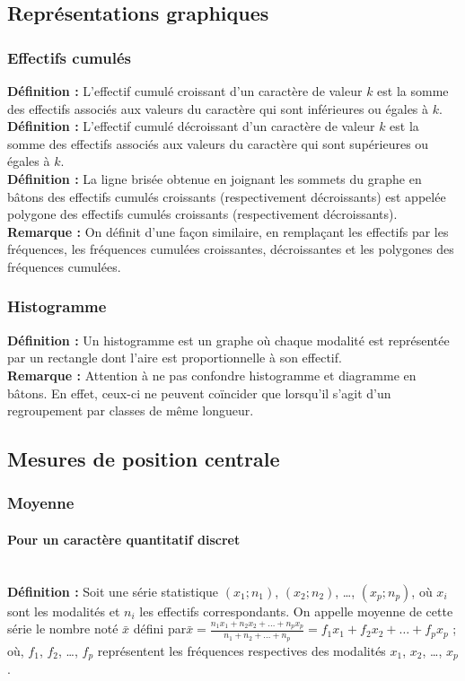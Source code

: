 \documentclass[a4paper,titlepage]{article}
\begin{document}
    \subsection{Représentations graphiques}
        \subsubsection{Effectifs cumulés}
            \textbf{Définition :} L’effectif cumulé croissant d’un caractère de valeur $k$ est la somme des effectifs associés aux valeurs du caractère qui sont inférieures ou égales à $k$.
            \\
            \textbf{Définition :} L’effectif cumulé décroissant d’un caractère de valeur $k$ est la somme des effectifs associés aux valeurs du caractère qui sont supérieures ou égales à $k$.
            \\
            \textbf{Définition :} La ligne brisée obtenue en joignant les sommets du graphe en bâtons des effectifs cumulés croissants (respectivement décroissants) est appelée polygone des effectifs cumulés croissants (respectivement décroissants).
            \\
            \textbf{Remarque :} On définit d’une façon similaire, en remplaçant les effectifs par les fréquences, les fréquences cumulées croissantes, décroissantes et les polygones des fréquences cumulées.
        \subsubsection{Histogramme}
            \textbf{Définition :} Un histogramme est un graphe où chaque modalité est représentée par un rectangle dont l’aire est proportionnelle à son effectif.
            \\
            \textbf{Remarque :} Attention à ne pas confondre histogramme et diagramme en bâtons. En effet, ceux-ci ne peuvent coïncider que lorsqu’il s’agit d’un regroupement par classes de même longueur.
    \subsection{Mesures de position centrale}
        \subsubsection{Moyenne}
            \paragraph{Pour un caractère quantitatif discret}\mbox{}\\
                \textbf{Définition :} Soit une série statistique $\left(x_{1};n_{1}\right)$, $\left(x_{2};n_{2}\right)$, \ldots, $\left(x_{p};n_{p}\right)$, où $x_{i}$ sont les modalités et $n_{i}$ les effectifs correspondants. On appelle moyenne de cette série le nombre noté $\bar{x}$ défini par\linebreak$\bar{x}=\frac{n_{1}x_{1}+n_{2}x_{2}+\ldots+n_{p}x_{p}}{n_{1}+n_{2}+\ldots+n_{p}}=f_{1}x_{1}+f_{2}x_{2}+\ldots+f_{p}x_{p}$ ; où, $f_{1}$, $f_{2}$, \ldots, $f_{p}$ représentent les fréquences respectives des modalités $x_{1}$, $x_{2}$, \ldots, $x_{p}$.
\end{document}
